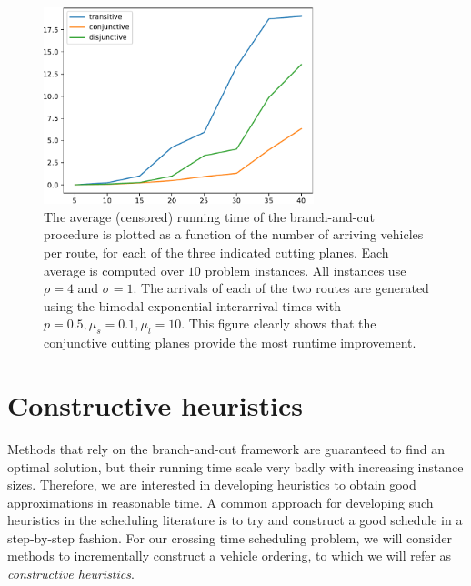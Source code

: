 \documentclass[a4paper]{article}
\theoremstyle{definition}
\theoremstyle{plain}
\begin{document}
\begin{figure}
  \centering
  \includegraphics[width=0.7\textwidth]{data-comparison/running_times.pdf}
  \caption{The average (censored) running time of the branch-and-cut procedure
    is plotted as a function of the number of arriving vehicles per route, for
    each of the three indicated cutting planes. Each average is computed over
    $10$ problem instances. All instances use $\rho = 4$ and $\sigma = 1$. The arrivals
    of each of the two routes are generated using the bimodal exponential
    interarrival times with $p=0.5, \mu_{s} = 0.1, \mu_{l} = 10$. This figure
    clearly shows that the conjunctive cutting planes provide the most runtime
    improvement.}
  \label{fig:running_time}
\end{figure}


\section{Constructive heuristics}

Methods that rely on the branch-and-cut framework are guaranteed to find an
optimal solution, but their running time scale very badly with increasing
instance sizes. Therefore, we are interested in developing heuristics to obtain
good approximations in reasonable time. A common approach for developing such
heuristics in the scheduling literature is to try and construct a good schedule
in a step-by-step fashion. For our crossing time scheduling problem, we will
consider methods to incrementally construct a vehicle ordering, to which we will
refer as \textit{constructive heuristics}.
\end{document}
